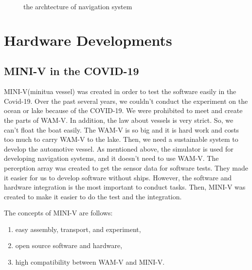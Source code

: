 \documentclass[lettersize,journal]{IEEEtran}
\begin{document}
\begin{figure}[t]
    \begin{center}
    \end{center}
    \caption{the archtecture of navigation system}
    \label{fig:arch_nav}
\end{figure}

\section{Hardware Developments}

\subsection{MINI-V in the COVID-19}
MINI-V(minitua vessel) was created in order to test the software easily in the Covid-19. Over the past several years, 
we couldn't conduct the experiment on the ocean or lake because of the COVID-19.
We were prohibited to meet and create the parts of WAM-V.
In addition, the law about vessels is very strict.
So, we can't float the boat easily. The WAM-V is so big and it is hard work and costs too much to carry WAM-V to the lake. 
Then, we need a sustainable system to develop the automotive vessel.
As mentioned above, the simulator is used for developing navigation systems, and it doesn't need to use WAM-V.
The perception array was created to get the sensor data for software tests. They made it easier for us to develop software without ships.
However, the software and hardware integration is the most important to conduct tasks. Then, MINI-V was created 
to make it easier to do the test and the integration.

The concepts of MINI-V are follows:
\begin{enumerate}
  \item easy assembly, transport, and experiment,
  \item open source software and hardware,
  \item high compatibility between WAM-V and MINI-V.
\end{enumerate}
\end{document}
